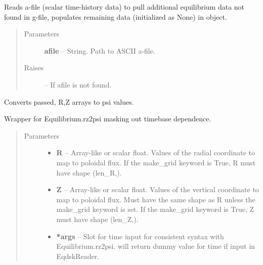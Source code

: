 \documentclass[letterpaper,10pt,english]{sphinxmanual}
\begin{document}
\begin{fulllineitems}
\begin{fulllineitems}
\end{fulllineitems}


\begin{fulllineitems}
\label{eqtools:eqtools.eqdskreader.EqdskReader.readAFile}
Reads a-file (scalar time-history data) to pull additional equilibrium data
not found in g-file, populates remaining data (initialized as None) in object.
\begin{quote}\begin{description}
\item[{Parameters}] \leavevmode
\textbf{afile} -- String.
Path to ASCII a-file.

\item[{Raises}] \leavevmode
{} -- If afile is not found.

\end{description}\end{quote}

\end{fulllineitems}


\begin{fulllineitems}
\label{eqtools:eqtools.eqdskreader.EqdskReader.rz2psi}
Converts passed, R,Z arrays to psi values.

Wrapper for Equilibrium.rz2psi masking out timebase dependence.
\begin{quote}\begin{description}
\item[{Parameters}] \leavevmode\begin{itemize}
\item {} 
\textbf{R} -- Array-like or scalar float.
Values of the radial coordinate to
map to poloidal flux. If the make\_grid keyword is True, R must
have shape (len\_R,).

\item {} 
\textbf{Z} -- Array-like or scalar float.
Values of the vertical coordinate to
map to poloidal flux. Must have the same shape as R unless the
make\_grid keyword is set. If the make\_grid keyword is True, Z
must have shape (len\_Z,).

\item {} 
\textbf{*args} -- Slot for time input for consistent syntax with Equilibrium.rz2psi.
will return dummy value for time if input in EqdskReader.


\end{itemize}
\end{description}
\end{quote}
\end{fulllineitems}
\end{fulllineitems}
\end{document}
